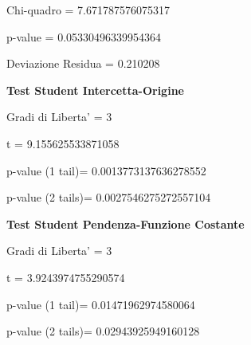 \documentclass{article}
\begin{document}
Chi-quadro = 7.671787576075317

p-value = 0.05330496339954364

Deviazione Residua = 0.210208

\textbf{Test Student Intercetta-Origine}

Gradi di Liberta' = 3

t = 9.155625533871058

p-value (1 tail)= 0.0013773137636278552

p-value (2 tails)= 0.0027546275272557104

\textbf{Test Student Pendenza-Funzione Costante}

Gradi di Liberta' = 3

t = 3.9243974755290574

p-value (1 tail)= 0.01471962974580064

p-value (2 tails)= 0.02943925949160128
\end{document}
